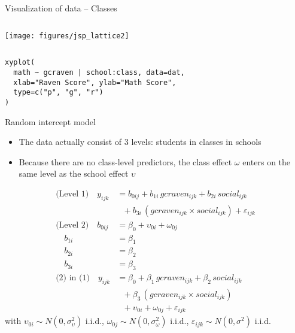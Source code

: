 \documentclass{beamer}
\begin{document}
\begin{frame}[fragile]{Visualization of data -- Classes}
  \begin{columns}
    \begin{column}{15cm}
      \texttt{[image: figures/jsp\_lattice2]}
    \end{column}
  \end{columns}
\begin{lstlisting}[style=plain]
xyplot(
  math ~ gcraven | school:class, data=dat,
  xlab="Raven Score", ylab="Math Score", 
  type=c("p", "g", "r")
)
\end{lstlisting}

\end{frame}

\begin{frame}{Random intercept model}
  \begin{itemize}
    \item The data actually consist of 3 levels: students in classes in
      schools
    \item Because there are no class-level predictors, the class effect
      $\omega$ enters on the same level as the school effect $\upsilon$
  \end{itemize}
\begin{align*}
\text{(Level 1)} \quad y_{ijk} &= b_{0ij} + b_{1i}\,gcraven_{ijk} + b_{2i}\,social_{ijk}\\
                  &~~~+ b_{3i}\,(gcraven_{ijk} \times social_{ijk}) +
                  \varepsilon_{ijk}\\
  \text{(Level 2)} \quad b_{0ij} &= \beta_0 + \upsilon_{0i} + \omega_{0j}\\
                  \quad b_{1i} &= \beta_1\\
                  \quad b_{2i} &= \beta_2\\
                  \quad b_{3i} &= \beta_3\\
\text{(2) in (1)} \quad y_{ijk} &= \beta_{0} + \beta_{1}\,gcraven_{ijk} +
  \beta_{2}\,social_{ijk}\\
                              &~~~ + \beta_{3}\,(gcraven_{ijk} \times social_{ijk})\\
                              &~~~ + \upsilon_{0i} + \omega_{0j} +
                              \varepsilon_{ijk}
\end{align*}
  \hspace{-.1cm}with $\upsilon_{0i} \sim N(0, \sigma^2_{\upsilon})$ i.i.d.,
$\omega_{0j} \sim N(0, \sigma^2_{\omega})$ i.i.d.,
$\varepsilon_{ijk} \sim N(0, \sigma^2)$ i.i.d.
\end{frame}
\end{document}
